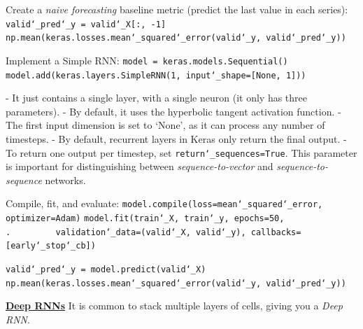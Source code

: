 Create a \textit{naive forecasting} baseline metric (predict the last value in each series):\newline
\texttt{valid\char`_pred\char`_y = valid\char`_X[:, -1]}\newline
\texttt{np.mean(keras.losses.mean\char`_squared\char`_error(valid\char`_y, valid\char`_pred\char`_y))}\newline\newline

Implement a Simple RNN:\newline
\texttt{model = keras.models.Sequential()}\newline
\texttt{model.add(keras.layers.SimpleRNN(1, input\char`_shape=[None, 1]))}

- It just contains a single layer, with a single neuron (it only has three parameters).\newline
- By default, it uses the hyperbolic tangent activation function.\newline
- The first input dimension is set to `None', as it can process any number of timesteps.\newline
- By default, recurrent layers in Keras only return the final output.\newline
- To return one output per timestep, set \texttt{return\char`_sequences=True}.
This parameter is important for distinguishing between
\textit{sequence-to-vector} and \textit{sequence-to-sequence} networks.\newline

Compile, fit, and evaluate:\newline
\texttt{model.compile(loss=\textquotesingle mean\char`_squared\char`_error\textquotesingle, optimizer=\textquotesingle Adam\textquotesingle)}\newline
\texttt{model.fit(train\char`_X, train\char`_y, epochs=50,\newline
.~~~~~~~~~validation\char`_data=(valid\char`_X, valid\char`_y), callbacks=[early\char`_stop\char`_cb])}

\texttt{valid\char`_pred\char`_y = model.predict(valid\char`_X)}\newline
\texttt{np.mean(keras.losses.mean\char`_squared\char`_error(valid\char`_y, valid\char`_pred\char`_y))}

\newpage
\textbf{\underline{Deep RNNs}}\newline
It is common to stack multiple layers of cells, giving you a \textit{Deep RNN}.

